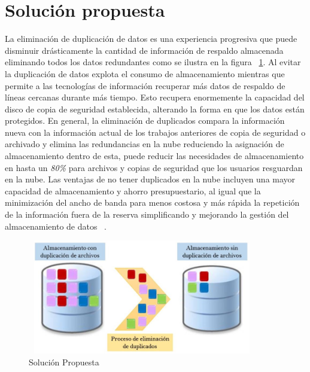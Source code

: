 \section{Solución propuesta}
La eliminación de duplicación de datos es una experiencia progresiva que puede disminuir drásticamente la cantidad de información de respaldo almacenada eliminando todos los datos redundantes como se ilustra en la figura ~\ref{fig:1-3-1}. Al evitar la duplicación de datos explota el consumo de almacenamiento mientras que permite a las tecnologías de información recuperar más datos de respaldo de líneas cercanas durante más tiempo. Esto recupera enormemente la capacidad del disco de copia de seguridad establecida, alterando la forma en que los datos están protegidos. En general,
la eliminación de duplicados compara la información nueva con la información actual de los trabajos anteriores de copia de seguridad o archivado y elimina las redundancias en la nube reduciendo la asignación de almacenamiento dentro de esta, puede reducir las necesidades de almacenamiento en hasta un \textit{80\%} para archivos y copias de seguridad que los usuarios resguardan en la nube. Las ventajas de no tener duplicados en la nube incluyen una mayor capacidad de almacenamiento y ahorro presupuestario, al igual que la minimización del ancho de banda para menos costosa y más rápida la repetición de la información fuera de la reserva simplificando y mejorando la gestión del almacenamiento de datos  ~\cite{rededup}. 


\begin{figure}[H]
\centering
	\includegraphics[width=10cm, height=5cm]{./images/Deduplicacion.jpg}
	\caption{Solución Propuesta}
	\label{fig:1-3-1}
\end{figure}

